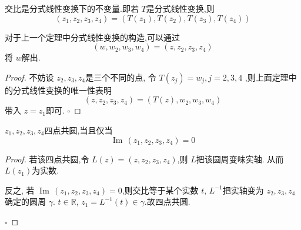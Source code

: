\documentclass[../../复变函数.tex]{subfiles}
\begin{document}
\begin{theorem}
      交比是分式线性变换下的不变量.即若 \(  T  \)是分式线性变换,则 \[
    \left( z_1,z_2,z_3,z_4 \right)= \left( T\left( z_1 \right),T\left( z_2 \right),T\left( z_3 \right),T\left( z_4 \right)     \right)  
    \] 
\end{theorem}
\begin{remark}
    对于上一个定理中分式线性变换的构造,可以通过\[
    \left( w,w_2,w_3,w_4 \right)= \left( z,z_2,z_3,z_4 \right)  
    \]将 \(  w  \)解出. 
\end{remark}
\begin{proof}
    不妨设 \(  z_2,z_3,z_4  \)是三个不同的点, 令 \(  T\left( z_{j} \right)= w_{j},j= 2,3,4   \) ,则上面定理中的分式线性变换的唯一性表明 \[
    \left( z,z_2,z_3,z_4 \right)=  \left( T\left( z \right),w_2,w_3,w_4  \right) 
    \]带入 \(  z= z_1  \)即可. 
    \hfill $\square$
\end{proof}

\begin{proposition}
    \(  z_1,z_2,z_3,z_4  \)四点共圆,当且仅当 \[
    \operatorname{Im}\,\left( z_1,z_2,z_3,z_4 \right)= 0 
    \] 
\end{proposition}
\begin{proof}
    若该四点共圆,令 \(  L\left( z \right)= \left( z,z_2,z_3,z_4 \right)    \),则 \(  L  \)把该圆周变味实轴. 从而 \(  L\left( z_1 \right)   \)为实数.
    
    反之, 若 \(  \operatorname{Im}\,\left( z_1,z_2,z_3,z_4 \right)= 0   \),则交比等于某个实数 \(  t  \), \(  L^{-1}   \)把实轴变为 \(  z_2,z_3,z_4  \)确定的圆周 \(   \gamma   \). \(  t \in \mathbb{R}   \), \(  z_1= L^{-1} \left( t \right) \in  \gamma    \).故四点共圆.  

    \hfill $\square$
\end{proof}
\end{document}
